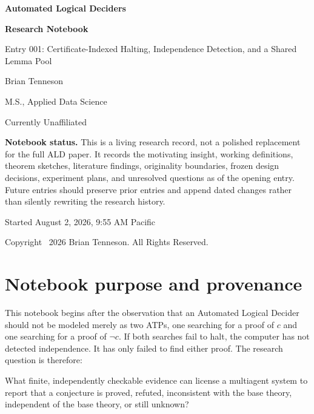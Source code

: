 \documentclass[11pt]{article}
\theoremstyle{definition}
\theoremstyle{remark}
\begin{document}
\begin{titlepage}
\centering
\vspace*{0.55in}
{\Huge\bfseries Automated Logical Deciders\par}
\vspace{0.12in}
{\LARGE\bfseries Research Notebook\par}
\vspace{0.18in}
{\Large Entry 001: Certificate-Indexed Halting, Independence Detection, and a Shared Lemma Pool\par}
\vspace{0.55in}
{\Large Brian Tenneson\par}
\vspace{0.08in}
{\large M.S., Applied Data Science\par}
{\large Currently Unaffiliated\par}
\vfill
\begin{minipage}{0.86\textwidth}
\small
\textbf{Notebook status.} This is a living research record, not a polished replacement for the full ALD paper. It records the motivating insight, working definitions, theorem sketches, literature findings, originality boundaries, frozen design decisions, experiment plans, and unresolved questions as of the opening entry. Future entries should preserve prior entries and append dated changes rather than silently rewriting the research history.
\end{minipage}
\vfill
{\large Started August 2, 2026, 9:55 AM Pacific\par}
\vspace{0.18in}
{\small Copyright \textcopyright\ 2026 Brian Tenneson. All Rights Reserved.\par}
\end{titlepage}

\tableofcontents
\clearpage

\section{Notebook purpose and provenance}

This notebook begins after the observation that an Automated Logical Decider should not be modeled merely as two ATPs, one searching for a proof of $c$ and one searching for a proof of $\neg c$. If both searches fail to halt, the computer has not detected independence. It has only failed to find either proof. The research question is therefore:

\begin{notebox}
What finite, independently checkable evidence can license a multiagent system to report that a conjecture is proved, refuted, inconsistent with the base theory, independent of the base theory, or still unknown?
\end{notebox}
\end{document}
